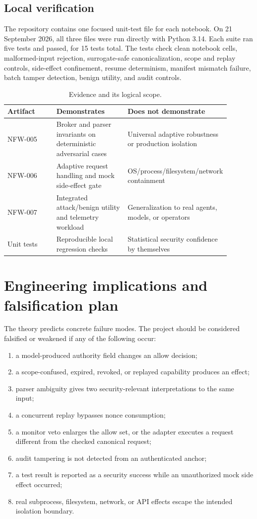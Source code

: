 \documentclass[11pt]{article}
\newcommand{\1}{\mathbf{1}}
\begin{document}
\subsection{Local verification}
The repository contains one focused unit-test file for each notebook. On 21 September 2026, all three files were run directly with Python 3.14. Each suite ran five tests and passed, for 15 tests total. The tests check clean notebook cells, malformed-input rejection, surrogate-safe canonicalization, scope and replay controls, side-effect confinement, resume determinism, manifest mismatch failure, batch tamper detection, benign utility, and audit controls.

\begin{table}[ht]
\centering
\caption{Evidence and its logical scope.}
\begin{tabular}{p{0.22\linewidth}p{0.32\linewidth}p{0.35\linewidth}}
\toprule
Artifact & Demonstrates & Does not demonstrate \\
\midrule
NFW-005 & Broker and parser invariants on deterministic adversarial cases & Universal adaptive robustness or production isolation \\
NFW-006 & Adaptive request handling and mock side-effect gate & OS/process/filesystem/network containment \\
NFW-007 & Integrated attack/benign utility and telemetry workload & Generalization to real agents, models, or operators \\
Unit tests & Reproducible local regression checks & Statistical security confidence by themselves \\
\bottomrule
\end{tabular}
\end{table}

\section{Engineering implications and falsification plan}

The theory predicts concrete failure modes. The project should be considered falsified or weakened if any of the following occur:
\begin{enumerate}
  \item a model-produced authority field changes an allow decision;
  \item a scope-confused, expired, revoked, or replayed capability produces an effect;
  \item parser ambiguity gives two security-relevant interpretations to the same input;
  \item a concurrent replay bypasses nonce consumption;
  \item a monitor veto enlarges the allow set, or the adapter executes a request different from the checked canonical request;
  \item audit tampering is not detected from an authenticated anchor;
  \item a test result is reported as a security success while an unauthorized mock side effect occurred;
  \item real subprocess, filesystem, network, or API effects escape the intended isolation boundary.
\end{enumerate}
\end{document}
